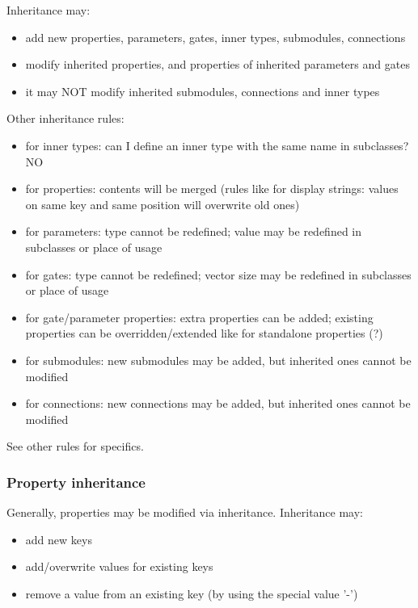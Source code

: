 Inheritance may:
\begin{itemize}
    \item add new properties, parameters, gates, inner types, submodules,
          connections
    \item modify inherited properties, and properties of inherited parameters and
          gates
    \item it may NOT modify inherited submodules, connections and inner types
\end{itemize}

Other inheritance rules:
\begin{itemize}
    \item  for inner types:
       can I define an inner type with the same name in subclasses? NO
    \item  for properties:
       contents will be merged (rules like for display strings: values on
       same key and same position will overwrite old ones)
    \item for parameters:
       type cannot be redefined;
       value may be redefined in subclasses or place of usage
    \item  for gates:
       type cannot be redefined;
       vector size may be redefined in subclasses or place of usage
    \item  for gate/parameter properties:
       extra properties can be added;
       existing properties can be overridden/extended like for standalone properties (?)
    \item  for submodules:
       new submodules may be added, but inherited ones cannot be modified
    \item  for connections:
       new connections may be added, but inherited ones cannot be modified
\end{itemize}

See other rules for specifics.

\subsubsection{Property inheritance}

Generally, properties may be modified via inheritance. Inheritance may:

\begin{itemize}
    \item add new keys
    \item add/overwrite values for existing keys
    \item remove a value from an existing key (by using the special value '-')
\end{itemize}


